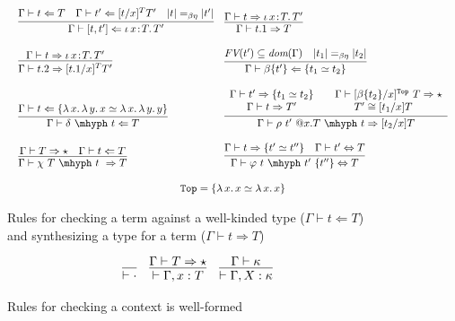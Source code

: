 \documentclass{article}
\newcommand{\abs}[4]{{#1}\, #2\! : \! #3.\, #4}
\newcommand{\absu}[3]{{#1}\, #2.\, #3}
\newcommand{\tpcheck}[0]{\Leftarrow}
\newcommand{\tpsynth}[0]{\Rightarrow}
\begin{document}
\begin{figure}
\[\begin{array}{c}
\begin{array}{ll}
    \infer{\Gamma\vdash [ t , t' ] \tpcheck \abs{\iota}{x}{T}{T'}}
          {\Gamma\vdash t \tpcheck T & \Gamma\vdash t' \tpcheck [t/x]^TT' & |t| =_{\beta\eta} |t'|} &
    \infer{\Gamma\vdash t.1 \tpsynth T}{\Gamma\vdash t \tpsynth \abs{\iota}{x}{T}{T'}} \\ \\
    \infer{\Gamma\vdash t.2 \tpsynth [t.1/x]^TT'}{\Gamma\vdash t \tpsynth \abs{\iota}{x}{T}{T'}} &
    \infer{\Gamma\vdash \beta\{t'\} \tpcheck \{ t_1 \simeq t_2 \}}
          {\textit{FV}(t')\subseteq \textit{dom}(\Gamma) \quad |t_1| =_{\beta\eta} |t_2|}  \\ \\    
    \infer{\Gamma\vdash \delta\ \mhyph\ t \tpcheck T}{\Gamma\vdash t\tpcheck \{ \absu{\lambda}{x}{\absu{\lambda}{y}{x}} \simeq \absu{\lambda}{x}{\absu{\lambda}{y}{y}}\}}  &
    \infer{\Gamma \vdash \rho\ t'\ @x.T\ \mhyph\ t \tpsynth [t_2/x]T}
          {
          \begin{array}{cc}
            \Gamma \vdash t' \tpsynth \{t_1 \simeq t_2\}
            & \quad \Gamma \vdash [\beta\{t_2\}/x]^{\texttt{Top}}\ T \tpsynth \star
            \\ \Gamma \vdash t \tpsynth T'
            & T' \cong [t_1/x]T
          \end{array}
          } \\ \\
    \infer{\Gamma \vdash \chi\ T\ \mhyph\ t\ \tpsynth T}
          {\Gamma \vdash T \tpsynth \star & \Gamma \vdash t \tpcheck T} &
    \infer{\Gamma\vdash \varphi\ t\ \mhyph\ t'\ \{t''\} \Leftrightarrow T}
          {\Gamma\vdash t\tpsynth \{t'\simeq t''\} & \Gamma\vdash t' \Leftrightarrow T}
  \end{array}
      \\ \\
      \texttt{Top} = \{\absu{\lambda}{x}{x} \simeq \absu{\lambda}{x}{x} \}
    \end{array}
  \]
\caption{Rules for checking a term against a well-kinded type ($\Gamma \vdash t \tpcheck T$)
           and synthesizing a type for a term ($\Gamma \vdash t \tpsynth T$)}
\label{fig:tp}
\end{figure}

\begin{figure}
  \centering
  \[
    \begin{array}{lll}
      \infer{\vdash \cdot}{}
      & \infer{
        \vdash \Gamma,x:T
        }{\Gamma \vdash T \tpsynth \star}
      & \infer{
        \vdash \Gamma,X:\kappa
        }{
        \Gamma \vdash \kappa
        }
    \end{array}
  \]
  \caption{Rules for checking a context is well-formed}
  \label{fig:ctxt}
\end{figure}
\end{document}
